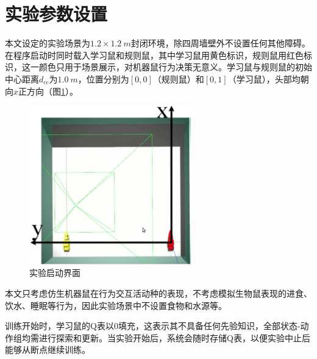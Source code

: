 \section{实验参数设置}
本文设定的实验场景为$1.2\times 1.2~m$封闭环境，除四周墙壁外不设置任何其他障碍。在程序启动时同时载入学习鼠和规则鼠，其中学习鼠用黄色标识，规则鼠用红色标识，这一颜色只用于场景展示，对机器鼠行为决策无意义。学习鼠与规则鼠的初始中心距离$d_{cc}$为$1.0~m$，位置分别为$[0,0]$（规则鼠）和$[0,1]$（学习鼠），头部均朝向$x$正方向（图\ref{figure_expsetup}）。
\begin{figure}[htb]
  \centering
  \includegraphics[width=7cm]{images/ch05/expsetup.png}
  \caption{实验启动界面}\label{figure_expsetup}
\end{figure}

本文只考虑仿生机器鼠在行为交互活动种的表现，不考虑模拟生物鼠表现的进食、饮水、睡眠等行为，因此实验场景中不设置食物和水源等。

训练开始时，学习鼠的Q表以0填充，这表示其不具备任何先验知识，全部状态-动作组均需进行探索和更新。当实验开始后，系统会随时存储Q表，以便实验中止后能够从断点继续训练。

